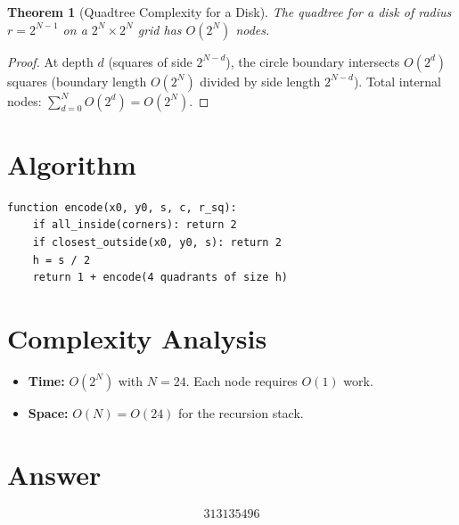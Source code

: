 \documentclass[12pt]{article}
\newtheorem{theorem}{Theorem}
\begin{document}
\begin{theorem}[Quadtree Complexity for a Disk]
The quadtree for a disk of radius $r = 2^{N-1}$ on a $2^N \times 2^N$ grid has $O(2^N)$ nodes.
\end{theorem}

\begin{proof}
At depth $d$ (squares of side $2^{N-d}$), the circle boundary intersects $O(2^d)$ squares (boundary length $O(2^N)$ divided by side length $2^{N-d}$). Total internal nodes: $\sum_{d=0}^{N} O(2^d) = O(2^N)$.
\end{proof}

\section{Algorithm}

\begin{verbatim}
function encode(x0, y0, s, c, r_sq):
    if all_inside(corners): return 2
    if closest_outside(x0, y0, s): return 2
    h = s / 2
    return 1 + encode(4 quadrants of size h)
\end{verbatim}

\section{Complexity Analysis}

\begin{itemize}
\item \textbf{Time:} $O(2^N)$ with $N = 24$. Each node requires $O(1)$ work.
\item \textbf{Space:} $O(N) = O(24)$ for the recursion stack.
\end{itemize}

\section{Answer}

\[
\boxed{313135496}
\]
\end{document}
